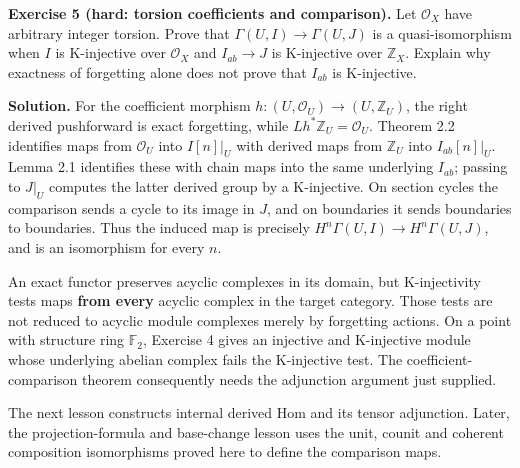 \documentclass[
  english,
  11pt,
  a4paper,
]{article}
\begin{document}
\textbf{Exercise 5 (hard: torsion coefficients and comparison).} Let
\(\mathcal O_X\) have arbitrary integer torsion. Prove that
\(\Gamma(U,I)\to\Gamma(U,J)\) is a quasi-isomorphism when \(I\) is
K-injective over \(\mathcal O_X\) and \(I_{ab}\to J\) is K-injective
over \(\mathbb Z_X\). Explain why exactness of forgetting alone does not
prove that \(I_{ab}\) is K-injective.

\textbf{Solution.} For the coefficient morphism
\(h:(U,\mathcal O_U)\to(U,\mathbb Z_U)\), the right derived pushforward
is exact forgetting, while \(Lh^*\mathbb Z_U=\mathcal O_U\). Theorem 2.2
identifies maps from \(\mathcal O_U\) into \(I[n]|_U\) with derived maps
from \(\mathbb Z_U\) into \(I_{ab}[n]|_U\). Lemma 2.1 identifies these
with chain maps into the same underlying \(I_{ab}\); passing to \(J|_U\)
computes the latter derived group by a K-injective. On section cycles
the comparison sends a cycle to its image in \(J\), and on boundaries it
sends boundaries to boundaries. Thus the induced map is precisely
\(H^n\Gamma(U,I)\to H^n\Gamma(U,J)\), and is an isomorphism for every
\(n\).

An exact functor preserves acyclic complexes in its domain, but
K-injectivity tests maps \textbf{from every} acyclic complex in the
target category. Those tests are not reduced to acyclic module complexes
merely by forgetting actions. On a point with structure ring
\(\mathbb F_2\), Exercise 4 gives an injective and K-injective module
whose underlying abelian complex fails the K-injective test. The
coefficient-comparison theorem consequently needs the adjunction
argument just supplied.

The next lesson constructs internal derived Hom and its tensor
adjunction. Later, the projection-formula and base-change lesson uses
the unit, counit and coherent composition isomorphisms proved here to
define the comparison maps.
\end{document}
